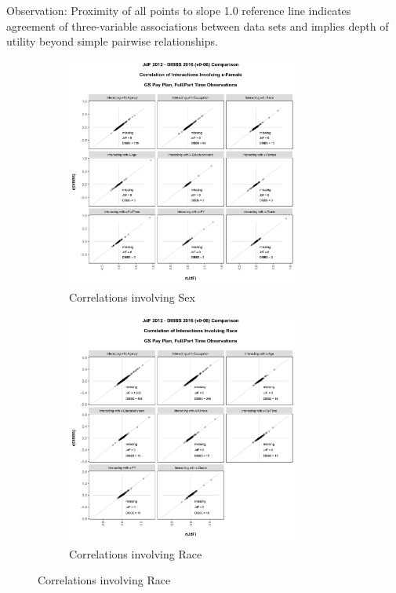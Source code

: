 \documentclass[10pt, letterpaper]{article}
\begin{document}
\begin{spacing}{1.0}
Observation:  Proximity of all points to slope 1.0 reference line indicates agreement of three-variable associations between data sets and implies depth of utility beyond simple pairwise relationships.\\

\begin{figure}[ht]
    \centering
    \begin{subfigure}{.5\textwidth}
        \centering
        \includegraphics[width=3in, trim={0 0.25in 0 1in}, clip]{JdFDIBBSCorrelationInteraction-x-Female.png}
        \caption{Correlations involving Sex}
        \vspace{10pt}
    \end{subfigure}%
    \begin{subfigure}{.5\textwidth}
        \centering
        \includegraphics[width=3in, trim={0 0.25in 0 1in}, clip]{JdFDIBBSCorrelationInteraction-Race.png}
        \caption{Correlations involving Race}
        \vspace{10pt}
    \end{subfigure}

\end{figure}
\end{spacing}
\end{document}
